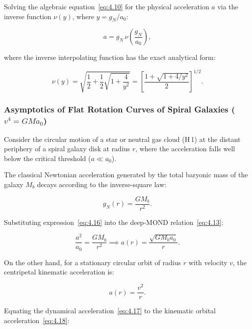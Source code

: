 \documentclass[11pt,a4paper]{article}
\theoremstyle{definition}
\newcommand{\ion}[2]{#1\,\textsc{\lowercase{#2}}}
\begin{document}
Solving the algebraic equation~\eqref{eq:4.10} for the physical acceleration $a$ via the inverse function $\nu(y)$, where $y = g_N / a_0$:

\begin{equation}\label{eq:4.14}\tag{4.14}
a = g_N \, \nu\left( \frac{g_N}{a_0} \right),
\end{equation}

where the inverse interpolating function has the exact analytical form:

\begin{equation}\label{eq:4.15}\tag{4.15}
\nu(y) = \sqrt{\frac{1}{2} + \frac{1}{2}\sqrt{1 + \frac{4}{y^2}}} = \left[ \frac{1 + \sqrt{1 + 4/y^2}}{2} \right]^{1/2}.
\end{equation}


\subsubsection{Asymptotics of Flat Rotation Curves of Spiral Galaxies ($v^4 = G M a_0$)}\label{sec:4.2.2}

Consider the circular motion of a star or neutral gas cloud (\ion{H}{1}) at the distant periphery of a spiral galaxy disk at radius $r$, where the acceleration falls well below the critical threshold ($a \ll a_0$).

The classical Newtonian acceleration generated by the total baryonic mass of the galaxy $M_b$ decays according to the inverse-square law:

\begin{equation}\label{eq:4.16}\tag{4.16}
g_N(r) = \frac{G M_b}{r^2}.
\end{equation}

Substituting expression~\eqref{eq:4.16} into the deep-MOND relation~\eqref{eq:4.13}:

\begin{equation}\label{eq:4.17}\tag{4.17}
\frac{a^2}{a_0} = \frac{G M_b}{r^2} \implies a(r) = \frac{\sqrt{G M_b a_0}}{r}.
\end{equation}

On the other hand, for a stationary circular orbit of radius $r$ with velocity $v$, the centripetal kinematic acceleration is:

\begin{equation}\label{eq:4.18}\tag{4.18}
a(r) = \frac{v^2}{r}.
\end{equation}

Equating the dynamical acceleration~\eqref{eq:4.17} to the kinematic orbital acceleration~\eqref{eq:4.18}:
\end{document}

